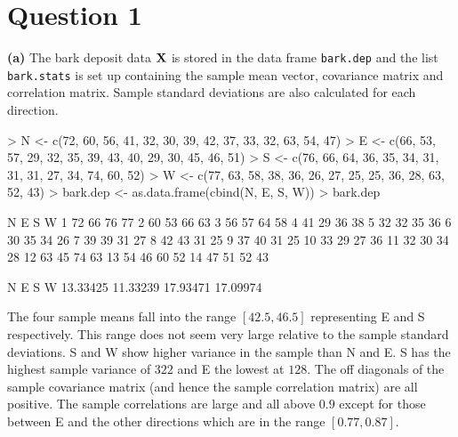 \documentclass[a4paper,11pt]{article}
\begin{document}
\section{Question 1}
{\bf (a)} The bark deposit data ${\bf X}$ is stored in the data frame \texttt{bark.dep} and the list \texttt{bark.stats} is set up containing the sample mean vector, covariance matrix and correlation matrix. Sample standard deviations are also calculated for each direction.
\begin{Schunk}
\begin{Sinput}
> N <- c(72, 60, 56, 41, 32, 30, 39, 42, 37, 33, 32, 63, 54, 47)
> E <- c(66, 53, 57, 29, 32, 35, 39, 43, 40, 29, 30, 45, 46, 51)
> S <- c(76, 66, 64, 36, 35, 34, 31, 31, 31, 27, 34, 74, 60, 52)
> W <- c(77, 63, 58, 38, 36, 26, 27, 25, 25, 36, 28, 63, 52, 43)
> bark.dep <- as.data.frame(cbind(N, E, S, W))
> bark.dep
\end{Sinput}
\begin{Soutput}
    N  E  S  W
1  72 66 76 77
2  60 53 66 63
3  56 57 64 58
4  41 29 36 38
5  32 32 35 36
6  30 35 34 26
7  39 39 31 27
8  42 43 31 25
9  37 40 31 25
10 33 29 27 36
11 32 30 34 28
12 63 45 74 63
13 54 46 60 52
14 47 51 52 43
\end{Soutput}
\begin{Soutput}
       N        E        S        W 
13.33425 11.33239 17.93471 17.09974 
\end{Soutput}
\end{Schunk}
The four sample means fall into the range $[
42.5
,
46.5
]$ representing E and S respectively. This range does not seem very large relative to the sample standard deviations. S and W show higher variance in the sample than N and E. S has the highest sample variance of $
322
$ and E the lowest at $
128
$. The off diagonals of the sample covariance matrix (and hence the sample correlation matrix) are all positive. The sample correlations are large and all above $0.9$ except for those between E and the other directions which are in the range $[0.77,0.87]$.
\\
\end{document}
